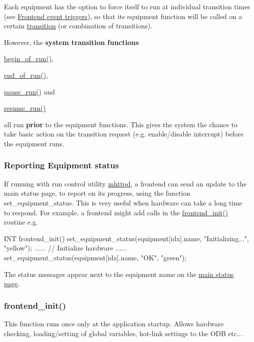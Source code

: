 Each equipment has the option to force itself to run at individual transition times (see \hyperlink{FrontendOperation_FE_event_trigger}{Frontend event triggers}), so that its equipment function will be called on a certain \hyperlink{RC_Run_States_and_Transitions}{transition} (or combination of transitions).

However, the {\bfseries system transition functions}
\begin{DoxyItemize}
\item \hyperlink{mfe_8c_ad8bfe703c49342b9f0275aba77dc7758}{begin\_\-of\_\-run()},
\item \hyperlink{mfe_8c_ae6d798649008b7523c77222bae2d4187}{end\_\-of\_\-run()},
\item \hyperlink{mfe_8c_a164db20cf6c8c81e8c8ca50a590de436}{pause\_\-run()} and
\item \hyperlink{mfe_8c_a6cada7e3f07b9fc2b9886263223661d4}{resume\_\-run()} \par
all run {\bfseries prior} to the equipment functions. This gives the system the chance to take basic action on the transition request (e.g. enable/disable interrupt) before the equipment runs.
\end{DoxyItemize}\hypertarget{FE_sequence_FE_frontend_status}{}\subsubsection{Reporting Equipment status}\label{FE_sequence_FE_frontend_status}
If running with run control utility \hyperlink{RC_mhttpd_utility}{mhttpd}, a frontend can send an update to the main status page, to report on its progress, using the function set\_\-equipment\_\-status. This is very useful when hardware can take a long time to respond. For example, a frontend might add calls in the \hyperlink{FE_sequence_FE_frontend_init}{frontend\_\-init()} routine e.g. 
\begin{DoxyCode}
INT frontend_init()
{
   set_equipment_status(equipment[idx].name, "Initializing...", "yellow");
   ......  // Initialize hardware 
   ......
   set_equipment_status(equipment[idx].name, "OK", "green");
}
\end{DoxyCode}


The status messages appear next to the equipment name on the \hyperlink{RC_mhttpd_status_page_features_idx_mhttpd_page_status_equipment}{main status page}.

\par
 \par
 \hypertarget{FE_sequence_FE_frontend_init}{}\subsubsection{frontend\_\-init()}\label{FE_sequence_FE_frontend_init}
This function runs once only at the application startup. Allows hardware checking, loading/setting of global variables, hot-\/link settings to the ODB etc...


